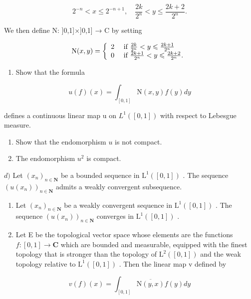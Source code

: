 \[
2 ^ {- n} <   x \leqslant 2 ^ {- n + 1}, \quad \frac {2 k}{2 ^ {n}} <   y \leqslant \frac {2 k + 2}{2 ^ {n}}.
\]

We then define N: ]0,1]×]0,1] → C by setting

\[
\mathrm{N} (x, y) = \left\{ \begin{array}{l l} 2 & \text { if } \frac {2 k}{2 ^ {n}} <   y \leqslant \frac {2 k + 1}{2 ^ {n}} \\ 0 & \text { if } \frac {2 k + 1}{2 ^ {n}} <   y \leqslant \frac {2 k + 2}{2 ^ {n}}. \end{array} \right.
\]

\begin{enumerate}
\def\labelenumi{\alph{enumi})}
\tightlist
\item
  Show that the formula
\end{enumerate}

\[
u (f) (x) = \int_ {[ 0, 1 ]} \mathrm{N} (x, y) f (y) d y
\]

defines a continuous linear map u on \(L^{1}([0,1])\) with respect to Lebesgue measure.

\begin{enumerate}
\def\labelenumi{\alph{enumi})}
\setcounter{enumi}{1}
\item
  Show that the endomorphism \(u\) is not compact.
\item
  The endomorphism \(u^2\) is compact.
\end{enumerate}

\(d)\) Let \((x_{n})_{n\in \mathbf{N}}\) be a bounded sequence in \(\mathrm{L}^1 ([0,1])\) . The sequence \((u(x_n))_{n\in \mathbf{N}}\) admits a weakly convergent subsequence.

\begin{enumerate}
\def\labelenumi{\alph{enumi})}
\setcounter{enumi}{4}
\item
  Let \((x_{n})_{n\in \mathbf{N}}\) be a weakly convergent sequence in \(\mathrm{L}^1 ([0,1])\) . The sequence \((u(x_{n}))_{n\in \mathbf{N}}\) converges in \(\mathrm{L}^1 ([0,1])\) .
\item
  Let E be the topological vector space whose elements are the functions \(f\colon[0,1]\to\mathbf{C}\) which are bounded and measurable, equipped with the finest topology that is stronger than the topology of \(\mathrm{L}^{2}([0,1])\) and the weak topology relative to \(\mathrm{L}^{1}([0,1])\) . Then the linear map v defined by
\end{enumerate}

\[
v (f) (x) = \int_ {[ 0, 1 ]} \overline {{\mathrm{N} (y , x)}} f (y) d y
\]

